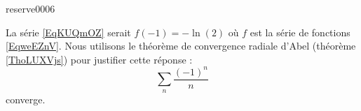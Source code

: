 

\begin{corrige}{reserve0006}

    La série \eqref{EqKUQmOZ} serait \( f(-1)=-\ln(2)\) où \( f\) est la série de fonctions \eqref{EqweEZnV}. Nous utilisons le théorème de convergence radiale d'Abel (théorème \ref{ThoLUXVjs}) pour justifier cette réponse :
    \begin{equation}
        \sum_n\frac{ (-1)^n }{ n }
    \end{equation}
    converge.

\end{corrige}

